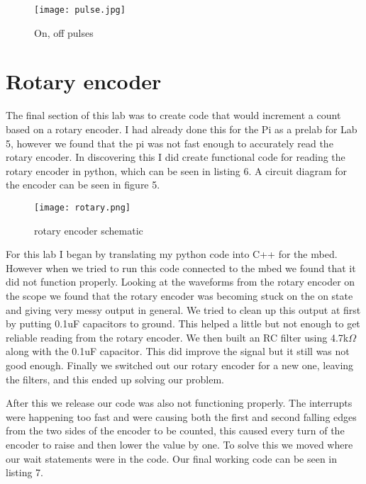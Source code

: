 \documentclass[prl,12pt,notitlepage,aps,onecolumn,superscriptaddress]{revtex4-1}
\newcommand{\ohm}{$\Omega$ }
\begin{document}
\begin{figure}[h]
\begin{center}
\texttt{[image: pulse.jpg]}
\end{center}
\caption{\label{fig:pic} On, off pulses}
\end{figure}


\section{Rotary encoder}
The final section of this lab was to create code that would increment a count based on a rotary encoder. I had already done this for the Pi as a prelab for Lab 5, however we found that the pi was not fast enough to accurately read the rotary encoder. In discovering this I did create functional code for reading the rotary encoder in python, which can be seen in listing 6. A circuit diagram for the encoder can be seen in figure 5.


\begin{figure}[h]
\begin{center}
\texttt{[image: rotary.png]}
\end{center}
\caption{\label{fig:pic} rotary encoder schematic}
\end{figure}


For this lab I began by translating my python code into C++ for the mbed. However when we tried to run this code connected to the mbed we found that it did not function properly. Looking at the waveforms from the rotary encoder on the scope we found that the rotary encoder was becoming stuck on the on state and giving very messy output in general. We tried to clean up this output at first by putting 0.1uF capacitors to ground. This helped a little but not enough to get reliable reading from the rotary encoder. We then built an RC filter using 4.7k\ohm along with the 0.1uF capacitor. This did improve the signal but it still was not good enough. Finally we switched out our rotary encoder for a new one, leaving the filters, and this ended up solving our problem.


After this we release our code was also not functioning properly. The interrupts were happening too fast and were causing both the first and second falling edges from the two sides of the encoder to be counted, this caused every turn of the encoder to raise and then lower the value by one. To solve this we moved where our wait statements were in the code. Our final working code can be seen in listing 7.
\end{document}
